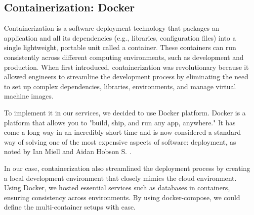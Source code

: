 \subsection{Containerization: Docker}

Containerization \cite{containers} is a software deployment technology that packages an application and all its dependencies (e.g., libraries, configuration files) into a single lightweight, portable unit called a container. These containers can run consistently across different computing environments, such as development and production. When first introduced, containerization was revolutionary because it allowed engineers to streamline the development process by eliminating the need to set up complex dependencies, libraries, environments, and manage virtual machine images.

To implement it in our services, we decided to use Docker platform. Docker is a platform that allows you to "build, ship, and run any app, anywhere." It has come a long way in an incredibly short time and is now considered a standard way of solving one of the most expensive aspects of software: deployment, as noted by Ian Miell and Aidan Hobson S. \cite{Docker}.

In our case, containerization also streamlined the deployment process by creating a local development environment that closely mimics the cloud environment. Using Docker, we hosted essential services such as databases in containers, ensuring consistency across environments. By using docker-compose, we could define the multi-container setups with ease.

